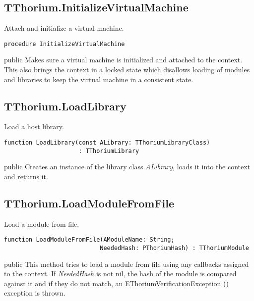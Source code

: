 \subsection{TThorium.InitializeVirtualMachine}
\label{thoriumcorepkg:thorium:tthorium:initializevirtualmachine}
\begin{FPCList}
\Synopsis
Attach and initialize a virtual machine.\Declaration 

\begin{verbatim}
procedure InitializeVirtualMachine
\end{verbatim}
\Visibility
public
\Description
Makes sure a virtual machine is initialized and attached to the context. This also brings the context in a locked state which disallows loading of modules and libraries to keep the virtual machine in a consistent state.\end{FPCList}
\subsection{TThorium.LoadLibrary}
\label{thoriumcorepkg:thorium:tthorium:loadlibrary}
\begin{FPCList}
\Synopsis
Load a host library.\Declaration 

\begin{verbatim}
function LoadLibrary(const ALibrary: TThoriumLibraryClass)
                     : TThoriumLibrary
\end{verbatim}
\Visibility
public
\Description
Creates an instance of the library class \textit{ALibrary}, loads it into the context and returns it.\end{FPCList}
\subsection{TThorium.LoadModuleFromFile}
\label{thoriumcorepkg:thorium:tthorium:loadmodulefromfile}
\begin{FPCList}
\Synopsis
Load a module from file.\Declaration 

\begin{verbatim}
function LoadModuleFromFile(AModuleName: String;
                           NeededHash: PThoriumHash) : TThoriumModule
\end{verbatim}
\Visibility
public
\Description
This method tries to load a module from file using any callbacks assigned to the context. If \textit{NeededHash} is not nil, the hash of the module is compared against it and if they do not match, an EThoriumVerificationException (\pageref{thoriumcorepkg:thorium:ethoriumverificationexception}) exception is thrown.\end{FPCList}

